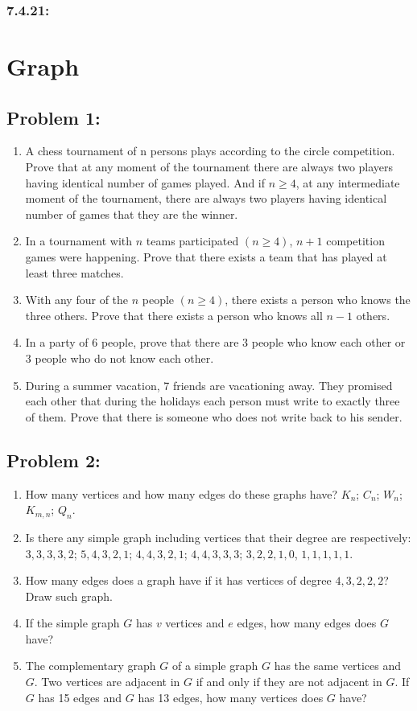 \documentclass[12pt,en,a4paper]{article}
\begin{document}
	\subsubsection*{7.4.21:}
	
	\newpage
	\section*{Graph}
	\subsection*{Problem 1:}
	\begin{enumerate}
	\item A chess tournament of n persons plays according to the circle competition. Prove that at any moment of the tournament there are always two players having identical number of games played. And if $n \geq 4$, at any intermediate moment of the tournament, there are always two players having identical number of games that they are the winner.
	\item In a tournament with $n$ teams participated $(n \geq 4)$, $n + 1$ competition games were happening. Prove that there exists a team that has played at least three matches.
	\item With any four of the $n$ people $(n \geq 4)$, there exists a person who knows the three others. Prove that there exists a person who knows all $n -1$ others.
	\item In a party of 6 people, prove that there are 3 people who know each other or 3 people who do not know each other.
	\item During a summer vacation, 7 friends are vacationing away. They promised each other that during the holidays each person must write to exactly three of them. Prove that there is someone who does not write back to his sender.
	\end{enumerate}
	
	\subsection*{Problem 2:}
	\begin{enumerate}
		\item How many vertices and how many edges do these graphs have? $K_n$; $C_n$; $W_n$; $K_{m, n}$; $Q_n$.
		\item Is there any simple graph including vertices that their degree are respectively: $3 ,3 ,3, 3, 2$; $5, 4, 3, 2, 1$; $4, 4, 3, 2 ,1$; $4, 4, 3, 3, 3$; $3, 2, 2, 1, 0$, $1, 1, 1, 1, 1$.
		\item How many edges does a graph have if it has vertices of degree $4, 3, 2, 2, 2$? Draw such graph.
		\item If the simple graph $G$ has $v$ vertices and $e$ edges, how many edges does $G$ have?
		\item The complementary graph $G$ of a simple graph $G$ has the same vertices and $G$. Two vertices are adjacent in $G$ if and only if they are not adjacent in $G$. If $G$ has 15 edges and $G$ has 13 edges, how many vertices does $G$ have?
	\end{enumerate}
	
\end{document}
